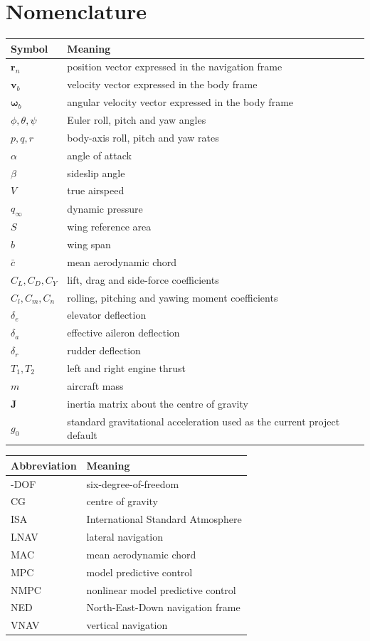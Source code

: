 \chapter*{Nomenclature}

\begin{longtable}{>{\raggedright\arraybackslash}p{}>{\raggedright\arraybackslash}p{}}
\toprule
Symbol & Meaning \\
\midrule
$\bm{r}_{n}$ & position vector expressed in the navigation frame \\
$\bm{v}_{b}$ & velocity vector expressed in the body frame \\
$\bm{\omega}_{b}$ & angular velocity vector expressed in the body frame \\
$\phi,\theta,\psi$ & Euler roll, pitch and yaw angles \\
$p,q,r$ & body-axis roll, pitch and yaw rates \\
$\alpha$ & angle of attack \\
$\beta$ & sideslip angle \\
$V$ & true airspeed \\
$q_{\infty}$ & dynamic pressure \\
$S$ & wing reference area \\
$b$ & wing span \\
$\bar{c}$ & mean aerodynamic chord \\
$C_L,C_D,C_Y$ & lift, drag and side-force coefficients \\
$C_l,C_m,C_n$ & rolling, pitching and yawing moment coefficients \\
$\delta_e$ & elevator deflection \\
$\delta_a$ & effective aileron deflection \\
$\delta_r$ & rudder deflection \\
$T_1,T_2$ & left and right engine thrust \\
$m$ & aircraft mass \\
$\bm{J}$ & inertia matrix about the centre of gravity \\
$g_0$ & standard gravitational acceleration used as the current project default \\
\bottomrule
\end{longtable}

\begin{longtable}{>{\raggedright\arraybackslash}p{}>{\raggedright\arraybackslash}p{}}
\toprule
Abbreviation & Meaning \\
\midrule
6-DOF & six-degree-of-freedom \\
CG & centre of gravity \\
ISA & International Standard Atmosphere \\
LNAV & lateral navigation \\
MAC & mean aerodynamic chord \\
MPC & model predictive control \\
NMPC & nonlinear model predictive control \\
NED & North-East-Down navigation frame \\
VNAV & vertical navigation \\
\bottomrule
\end{longtable}
